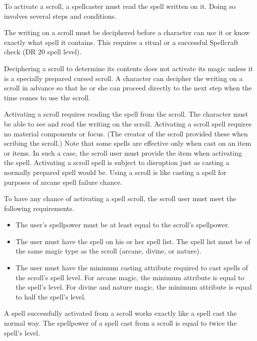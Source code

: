          To activate a scroll, a spellcaster must read the spell written on it.
        Doing so involves several steps and conditions.

         The writing on a scroll must be deciphered before a character can use it or know exactly what spell it contains.
        This requires a  ritual or a successful Spellcraft check (DR 20 \add spell level).

        Deciphering a scroll to determine its contents does not activate its magic unless it is a specially prepared cursed scroll.
        A character can decipher the writing on a scroll in advance so that he or she can proceed directly to the next step when the time comes to use the scroll.

         Activating a scroll requires reading the spell from the scroll.
        The character must be able to see and read the writing on the scroll.
        Activating a scroll spell requires no material components or focus.
        (The creator of the scroll provided these when scribing the scroll.) Note that some spells are effective only when cast on an item or items.
        In such a case, the scroll user must provide the item when activating the spell.
        Activating a scroll spell is subject to disruption just as casting a normally prepared spell would be.
        Using a scroll is like casting a spell for purposes of arcane spell failure chance.

        To have any chance of activating a spell scroll, the scroll user must meet the following requirements.
        \begin{itemize}
            \item The user's spellpower must be at least equal to the scroll's spellpower.
            \item The user must have the spell on his or her spell list.
                The spell list must be of the same magic type as the scroll (arcane, divine, or nature).
            \item The user must have the minimum casting attribute required to cast spells of the scroll's spell level.
                For arcane magic, the minimum attribute is equal to the spell's level.
                For divine and nature magic, the minimum attribute is equal to half the spell's level.
        \end{itemize}

         A spell successfully activated from a scroll works exactly like a spell cast the normal way.
        The spellpower of a spell cast from a scroll is equal to twice the spell's level.

